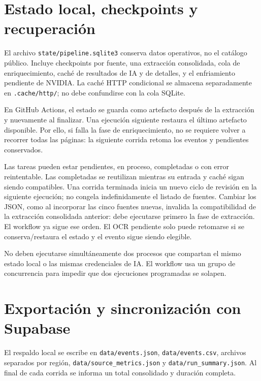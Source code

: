 \documentclass[11pt,a4paper]{article}
\begin{document}
\section{Estado local, checkpoints y recuperaci\'{o}n}

El archivo \texttt{state/pipeline.sqlite3} conserva datos operativos, no el cat\'{a}logo p\'{u}blico. Incluye checkpoints por fuente, una extracci\'{o}n consolidada, cola de enriquecimiento, cach\'{e} de resultados de IA y de detalles, y el enfriamiento pendiente de NVIDIA. La cach\'{e} HTTP condicional se almacena separadamente en \texttt{.cache/http/}; no debe confundirse con la cola SQLite.

En GitHub Actions, el estado se guarda como artefacto despu\'{e}s de la extracci\'{o}n y nuevamente al finalizar. Una ejecuci\'{o}n siguiente restaura el \'{u}ltimo artefacto disponible. Por ello, si falla la fase de enriquecimiento, no se requiere volver a recorrer todas las p\'{a}ginas: la siguiente corrida retoma los eventos y pendientes conservados.

Las tareas pueden estar pendientes, en proceso, completadas o con error reintentable. Las completadas se reutilizan mientras su entrada y cach\'{e} sigan siendo compatibles. Una corrida terminada inicia un nuevo ciclo de revisi\'{o}n en la siguiente ejecuci\'{o}n; no congela indefinidamente el listado de fuentes. Cambiar los JSON, como al incorporar las cinco fuentes nuevas, invalida la compatibilidad de la extracci\'{o}n consolidada anterior: debe ejecutarse primero la fase de extracci\'{o}n. El workflow ya sigue ese orden. El OCR pendiente solo puede retomarse si se conserva/restaura el estado y el evento sigue siendo elegible.

No deben ejecutarse simult\'{a}neamente dos procesos que compartan el mismo estado local o las mismas credenciales de IA. El workflow usa un grupo de concurrencia para impedir que dos ejecuciones programadas se solapen.

\section{Exportaci\'{o}n y sincronizaci\'{o}n con Supabase}

El respaldo local se escribe en \texttt{data/events.json}, \texttt{data/events.csv}, archivos separados por regi\'{o}n, \texttt{data/source\_metrics.json} y \texttt{data/run\_summary.json}. Al final de cada corrida se informa un total consolidado y duraci\'{o}n completa.
\end{document}
